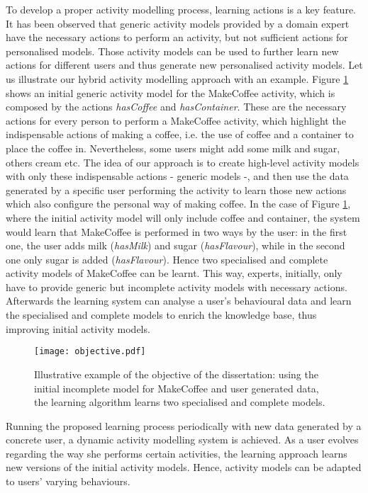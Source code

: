 To develop a proper activity modelling process, learning actions is a key feature. It has been observed that generic activity models provided by a domain expert have the necessary actions to perform an activity, but not sufficient actions for personalised models. Those activity models can be used to further learn new actions for different users and thus generate new personalised activity models. Let us illustrate our hybrid activity modelling approach with an example. Figure \ref{fig-objective} shows an initial generic activity model for the MakeCoffee activity, which is composed by the actions \textit{hasCoffee} and \textit{hasContainer}. These are the necessary actions for every person to perform a MakeCoffee activity, which highlight the indispensable actions of making a coffee, i.e. the use of coffee and a container to place the coffee in. Nevertheless, some users might add some milk and sugar, others cream etc. The idea of our approach is to create high-level activity models with only these indispensable actions - generic models -, and then use the data generated by a specific user performing the activity to learn those new actions which also configure the personal way of making coffee. In the case of Figure \ref{fig-objective}, where the initial activity model will only include coffee and container, the system would learn that MakeCoffee is performed in two ways by the user: in the first one, the user adds milk (\textit{hasMilk}) and sugar (\textit{hasFlavour}), while in the second one only sugar is added (\textit{hasFlavour}). Hence two specialised and complete activity models of MakeCoffee can be learnt. This way, experts, initially, only have to provide generic but incomplete activity models with necessary actions. Afterwards the learning system can analyse a user's behavioural data and learn the specialised and complete models to enrich the knowledge base, thus improving initial activity models.

\begin{figure}[htbp]
\centering
\texttt{[image: objective.pdf]}
    \caption{Illustrative example of the objective of the dissertation: using the initial incomplete model for MakeCoffee and user generated data, the learning algorithm learns two specialised and complete models.}
    \label{fig-objective}
\end{figure}


Running the proposed learning process periodically with new data generated by a concrete user, a dynamic activity modelling system is achieved. As a user evolves regarding the way she performs certain activities, the learning approach learns new versions of the initial activity models. Hence, activity models can be adapted to users' varying behaviours.

